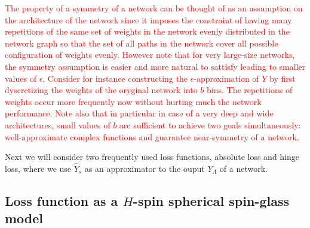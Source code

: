 \documentclass[twoside]{article}
\begin{document}
\textcolor{red}{The property of a symmetry of a network can be thought of as an assumption on the architecture of the network since it imposes the constraint of having many repetitions of the same set of weights in the network evenly distributed in the network graph so that the set of all paths in the network cover all possible configuration of weights evenly. However note that for very large-size networks, the symmetry assumption is easier and more natural to sattisfy leading to smaller values of $\epsilon$. Consider for instance constructing the $\epsilon$-approximation of $Y$ by first dyscretizing the weights of the oryginal network into $b$ bins. The repetitions of weights occur more frequently now without hurting much the network performance. Note also that in particular in case of a very deep and wide architectures, small values of $b$ are sufficient to achieve two goals simultaneously: well-approximate complex functions and guarantee near-symmetry of a network.}

Next we will consider two frequently used loss functions, absolute loss and hinge loss, where we use $\hat{Y}_s$ as an approximator to the ouput $Y_{\Lambda}$ of a network. 

\subsection{Loss function as a $H$-spin spherical spin-glass model}
\end{document}
